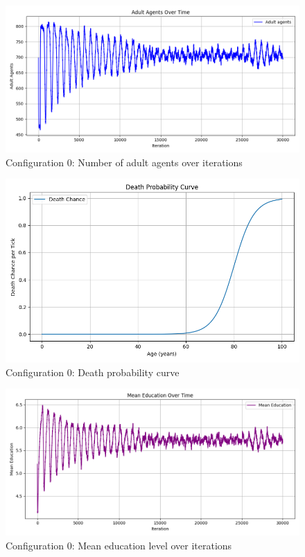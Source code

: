 \documentclass[english]{projectreport}
\begin{document}
    \begin{figure}[H]
        \centering
        \includegraphics[width=0.8\linewidth]{metrics_config0/metrics_config0_adult_agents.png}
        \caption{Configuration 0: Number of adult agents over iterations}
        \label{fig:c0-adult_agents}
    \end{figure}

    \begin{figure}[H]
        \centering
        \includegraphics[width=0.8\linewidth]{metrics_config0/metrics_config0_death_probability_curve.png}
        \caption{Configuration 0: Death probability curve}
        \label{fig:c0-death_probability_curve}
    \end{figure}

    \begin{figure}[H]
        \centering
        \includegraphics[width=0.8\linewidth]{metrics_config0/metrics_config0_mean_education.png}
        \caption{Configuration 0: Mean education level over iterations}
        \label{fig:c0-mean_education}
    \end{figure}
\end{document}
